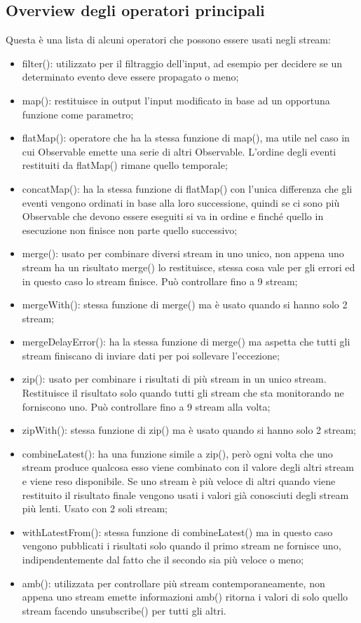 \documentclass{article}
\begin{document}
\subsection{Overview degli operatori principali}
Questa è una lista di alcuni operatori che possono essere usati negli stream:
\begin{itemize}
\item filter(): utilizzato per il filtraggio dell’input, ad esempio per decidere se un determinato evento deve essere propagato o meno;
\item map(): restituisce in output l’input modificato in base ad un opportuna funzione come parametro;
\item flatMap(): operatore che ha la stessa funzione di map(), ma utile nel caso in cui Observable emette una serie di altri Observable. L’ordine degli eventi restituiti da flatMap() rimane quello temporale;
\item concatMap(): ha la stessa funzione di flatMap() con l’unica differenza che gli eventi vengono ordinati in base alla loro successione, quindi se ci sono più Observable che devono essere eseguiti si va in ordine e finché quello in esecuzione non finisce non parte quello successivo;
\item merge(): usato per combinare diversi stream in uno unico, non appena uno stream ha un risultato merge() lo restituisce, stessa cosa vale per gli errori ed in questo caso lo stream finisce. Può controllare fino a 9 stream;
\item mergeWith(): stessa funzione di merge() ma è usato quando si hanno solo 2 stream;
\item mergeDelayError(): ha la stessa funzione di merge() ma aspetta che tutti gli stream finiscano di inviare dati per poi sollevare l’eccezione;
\item zip(): usato per combinare i risultati di più stream in un unico stream. Restituisce il risultato solo quando tutti gli stream che sta monitorando ne forniscono uno. Può controllare fino a 9 stream alla volta;
\item zipWith(): stessa funzione di zip() ma è usato quando si hanno solo 2 stream;
\item combineLatest(): ha una funzione simile a zip(), però ogni volta che uno stream produce qualcosa esso viene combinato con il valore degli altri stream e viene reso disponibile. Se uno stream è più veloce di altri quando viene restituito il risultato finale vengono usati i valori già conosciuti degli stream più lenti. Usato con 2 soli stream;
\item withLatestFrom(): stessa funzione di combineLatest() ma in questo caso vengono pubblicati i risultati solo quando il primo stream ne fornisce uno, indipendentemente dal fatto che il secondo sia più veloce o meno;
 \item amb(): utilizzata per controllare più stream contemporaneamente, non appena uno stream emette informazioni amb() ritorna i valori di solo quello stream facendo unsubscribe() per tutti gli altri.
\end{itemize}
\end{document}
